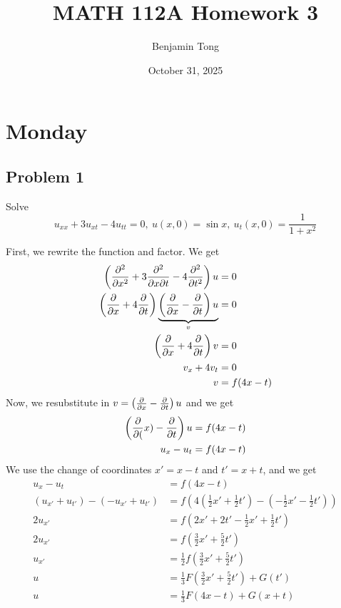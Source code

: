 \documentclass{ben}
\title{MATH 112A Homework 3}
\author{Benjamin Tong}
\date{October 31, 2025}
\begin{document}
\maketitle
\section{Monday}
\subsection{Problem 1}
Solve
\[
    u_{xx} + 3 u_{xt} - 4 u_{tt} = 0,\ u(x, 0) = \sin x,\ u_t(x, 0) = \frac{1}{1 + x^2}
\]
\begin{solution}
First, we rewrite the function and factor. We get
\begin{align*}
    \left( \frac{\partial^2}{\partial x^2}
    + 3 \frac{\partial^2}{\partial x \partial t}
    - 4 \frac{\partial^2}{\partial t^2} \right) u &= 0\\
    \left( \frac{\partial }{\partial x} + 4 \frac{\partial }{\partial t} \right)
    \underbrace{\left( \frac{\partial }{\partial x} - \frac{\partial }{\partial t} \right) u}_{v} &= 0\\
    \left( \frac{\partial }{\partial x} + 4 \frac{\partial }{\partial t} \right) v &= 0\\
    v_x + 4 v_t &= 0\\
    v &= f(4x - t)
\end{align*}
Now, we resubstitute in $v = \left( \frac{\partial }{\partial x} - \frac{\partial }{\partial t} \right) u$ and we get
\begin{align*}
    \left( \frac{\partial }{\partial (}x) - \frac{\partial }{\partial t} \right) u &= f(4x - t)\\
    u_x - u_t &= f(4x - t)
\end{align*}
We use the change of coordinates $x' = x - t$ and $t' = x + t$, and we get
\begin{align*}
    u_x - u_t &= f(4x - t)\\
    (u_{x'} + u_{t'}) - (-u_{x'} + u_{t'})
    &= f\left(4\left(\frac{1}{2}x' + \frac{1}{2}t'\right) - \left(-\frac{1}{2}x' - \frac{1}{2}t'\right)\right)\\
    2 u_{x'} &= f\left( 2x' + 2t' - \frac{1}{2}x' + \frac{1}{2}t' \right)\\
    2 u_{x'} &= f\left(\frac{3}{2} x' + \frac{5}{2} t'\right)\\
    u_{x'} &= \frac{1}{2} f \left( \frac{3}{2} x' + \frac{5}{2} t' \right)\\
    u &= \frac{1}{3} F \left( \frac{3}{2} x' + \frac{5}{2} t' \right) + G(t')\\
    u &= \frac{1}{3} F \left(4x - t\right) + G(x + t)\\

\end{align*}
\end{solution}
\end{document}
